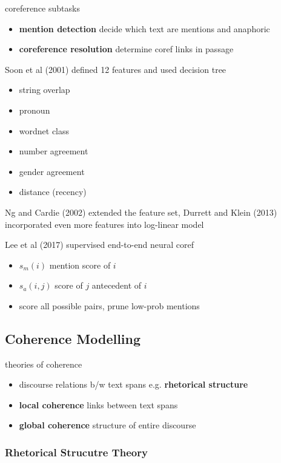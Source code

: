 \documentclass[]{article}
\theoremstyle{definition}
\begin{document}
coreference subtasks
\begin{itemize}
    \item \textbf{mention detection} decide which text are mentions and anaphoric
    \item \textbf{coreference resolution} determine coref links in passage
\end{itemize}

Soon et al (2001) defined 12 features and used decision tree
\begin{itemize}
    \item string overlap
    \item pronoun
    \item wordnet class
    \item number agreement
    \item gender agreement
    \item distance (recency)
\end{itemize}

Ng and Cardie (2002) extended the feature set, Durrett and Klein (2013) incorporated even more features into log-linear model


Lee et al (2017) supervised end-to-end neural coref
\begin{itemize}
    \item $s_m(i)$ mention score of $i$
    \item $s_a(i,j)$ score of $j$ antecedent of $i$
    \item score all possible pairs, prune low-prob mentions
\end{itemize}


\subsection{Coherence Modelling}%
\label{sub:coherence_modelling}

theories of coherence
\begin{itemize}
    \item discourse relations b/w text spans e.g. \textbf{rhetorical structure}
    \item \textbf{local coherence} links between text spans
    \item \textbf{global coherence} structure of entire discourse
\end{itemize}

\subsubsection{Rhetorical Strucutre Theory}%
\label{ssub:rhetorical_strucutre_theory}
\end{document}
